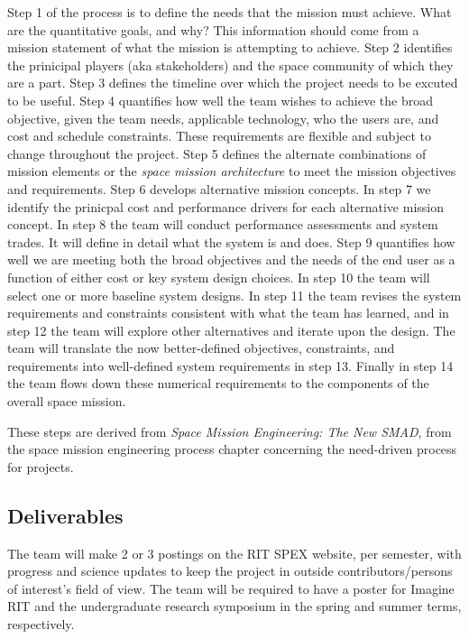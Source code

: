 \documentclass[conference]{IEEEtran} %
\begin{document}
Step 1 of the process is to define the needs that the mission must achieve. What are the quantitative goals, and why? This information should come
from a mission statement of what the mission is attempting to achieve. Step 2 identifies the prinicipal players (aka stakeholders) and the space community
of which they are a part. Step 3 defines the timeline over which the project needs to be excuted to be useful. Step 4 quantifies how well the team wishes
to achieve the broad objective, given the team needs, applicable technology, who the users are, and cost and schedule constraints. These requirements are
flexible and subject to change throughout the project. Step 5 defines the alternate combinations of mission elements or the \textit{space mission architecture} to meet
the mission objectives and requirements. Step 6 develops alternative mission concepts. In step 7 we identify the prinicpal cost and performance drivers for each
alternative mission concept. In step 8 the team will conduct performance assessments and system trades. It will define in detail what the system is and does. Step 9
quantifies how well we are meeting both the broad objectives and the needs of the end user as a function of either cost or key system design choices. In step 10 the team
will select one or more baseline system designs. In step 11 the team revises the system requirements and constraints consistent with what the team has learned, and in step 12
the team will explore other alternatives and iterate upon the design. The team will translate the now better-defined objectives, constraints, and requirements into well-defined
system requirements in step 13. Finally in step 14 the team flows down these numerical requirements to the components of the overall space mission.

These steps are derived from \textit{Space Mission Engineering: The New SMAD}, from the space mission engineering process chapter concerning the need-driven process for projects.
\subsection{Deliverables}
\label{subsec:deliverables}
The team will make 2 or 3 postings on the RIT SPEX website, per semester, with progress and science updates to keep the project in outside contributors/persons of
interest's field of view. The team will be required to have a poster for Imagine RIT and the undergraduate research symposium in the spring and summer terms, respectively.
\end{document}
